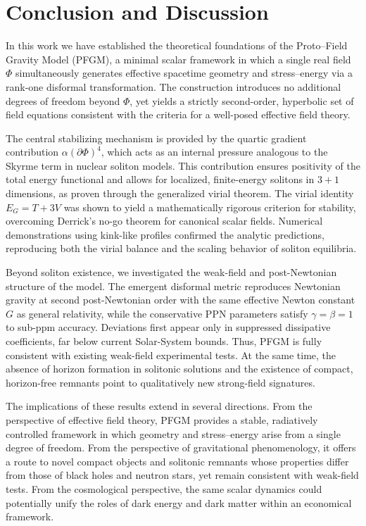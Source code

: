 \documentclass{article}
\begin{document}
\section{Conclusion and Discussion}
\label{sec:conclusion}

In this work we have established the theoretical foundations of the Proto--Field Gravity Model (PFGM), a minimal scalar framework in which a single real field $\Phi$ simultaneously generates effective spacetime geometry and stress--energy via a rank-one disformal transformation. The construction introduces no additional degrees of freedom beyond $\Phi$, yet yields a strictly second-order, hyperbolic set of field equations consistent with the criteria for a well-posed effective field theory.

The central stabilizing mechanism is provided by the quartic gradient contribution $\alpha (\partial\Phi)^4$, which acts as an internal pressure analogous to the Skyrme term in nuclear soliton models. This contribution ensures positivity of the total energy functional and allows for localized, finite-energy solitons in $3+1$ dimensions, as proven through the generalized virial theorem. The virial identity $E_G = T + 3V$ was shown to yield a mathematically rigorous criterion for stability, overcoming Derrick’s no-go theorem for canonical scalar fields. Numerical demonstrations using kink-like profiles confirmed the analytic predictions, reproducing both the virial balance and the scaling behavior of soliton equilibria.

Beyond soliton existence, we investigated the weak-field and post-Newtonian structure of the model. The emergent disformal metric reproduces Newtonian gravity at second post-Newtonian order with the same effective Newton constant $G$ as general relativity, while the conservative PPN parameters satisfy $\gamma = \beta = 1$ to sub-ppm accuracy. Deviations first appear only in suppressed dissipative coefficients, far below current Solar-System bounds. Thus, PFGM is fully consistent with existing weak-field experimental tests. At the same time, the absence of horizon formation in solitonic solutions and the existence of compact, horizon-free remnants point to qualitatively new strong-field signatures.

The implications of these results extend in several directions. From the perspective of effective field theory, PFGM provides a stable, radiatively controlled framework in which geometry and stress--energy arise from a single degree of freedom. From the perspective of gravitational phenomenology, it offers a route to novel compact objects and solitonic remnants whose properties differ from those of black holes and neutron stars, yet remain consistent with weak-field tests. From the cosmological perspective, the same scalar dynamics could potentially unify the roles of dark energy and dark matter within an economical framework.
\end{document}
